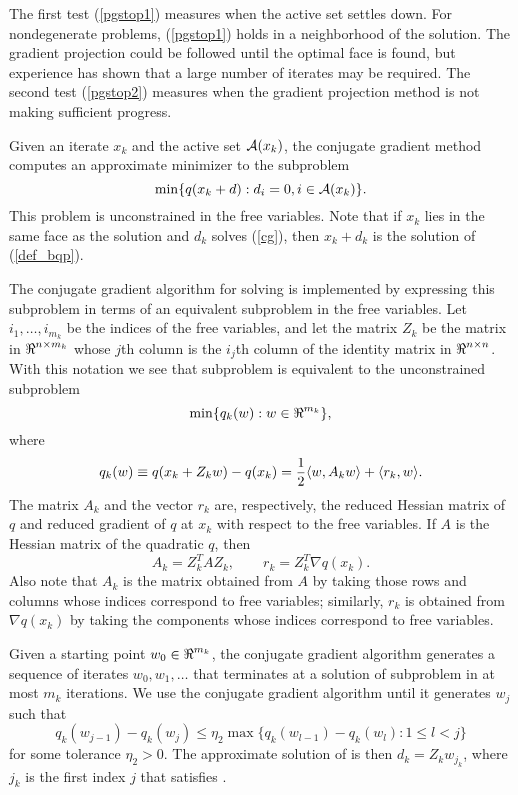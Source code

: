 The first test (\ref{pgstop1}) measures when the
active set settles down. For nondegenerate problems, 
(\ref{pgstop1}) holds in a neighborhood of the solution.
The gradient
projection could be followed until the optimal face is found, but
experience has shown that a large number of iterates may be required.
The second test (\ref{pgstop2}) measures when
the gradient projection method is not making sufficient progress.

Given an iterate $x_k$ and the active set  ${\cal A}(x_k)$,
the conjugate gradient method computes an approximate
minimizer to the subproblem
\begin{equation} \label{cg}
\min \{ q(x_k + d): d_i = 0, i \in {\cal A}(x_k) \}.
\end{equation}
This problem is unconstrained in the free variables.  Note that
if $x_k$ lies in the same face as the solution and $d_k$ solves
(\ref{cg}), then $x_k + d_k$ is the solution of (\ref{def_bqp}).

The conjugate gradient algorithm for solving
 is implemented by expressing
this subproblem in terms of an equivalent subproblem in the
free variables.
Let $ i_1, \ldots, i_{m_k} $
be the indices of the free variables, and let
the matrix $Z_k$ be the matrix in $\mbox{${\Re}$}^{n \times m_k} $ whose
$j$th column is the $i_j$th column of the identity matrix in
$\mbox{${\Re}$}^{n \times n}$. With this notation we see that
subproblem  is equivalent to the
unconstrained subproblem
\begin{equation}
\min \{ q _ k ( w ) : w \in \mbox{${\Re}$} ^ { m_k } \}  ,
\label{cg2}
\end{equation}
where
\[
q_k(w) \equiv q ( x _ k + Z _ k  w ) - q ( x_k ) =
\frac{1}{2} \langle w , {A_k} w \rangle + \langle r_k , w \rangle  .
\]
The matrix $ A_k $ and the vector $ r_k $ are, respectively, the
reduced Hessian matrix of $q$ and reduced gradient of $q$ at $x_k$
with respect to the free variables.
If $A$ is the Hessian matrix of the quadratic $q$, then
\[
A_k = Z_k^T A Z_k , \qquad r_k = Z_k^T \nabla q(x_k)  .
\]
Also note that $A_k$ is the matrix obtained from
$A$ by taking those rows and columns whose indices correspond
to free variables;
similarly, $r_k$ is obtained from $\nabla q(x_k)$ by
taking the components whose indices correspond to free variables.

Given a starting point $ w_0 \in \mbox{${\Re}$}^{m_k} $, the conjugate gradient algorithm
generates a sequence of iterates $ w _ 0 , w_1 , \ldots $
that terminates at a solution
of subproblem  in at most $m_k$ iterations.
We use the conjugate gradient algorithm 
until it generates $ w _ j $ such that
\begin{equation}
q_k ( w_{j-1} ) - q_k ( w _ {j} ) \le \eta_2 \max \{
q_k ( w_{l-1} ) - q_k ( w _ {l} ) : 1 \le l \lt j \}
\label{cgstop1}
\end{equation}
for some tolerance $ \eta_2 > 0 $. 
The approximate 
solution of  is then
$ d _ k = Z_k w _ {j_k} $, where $j_k$ is the first index $j$
that satisfies .

